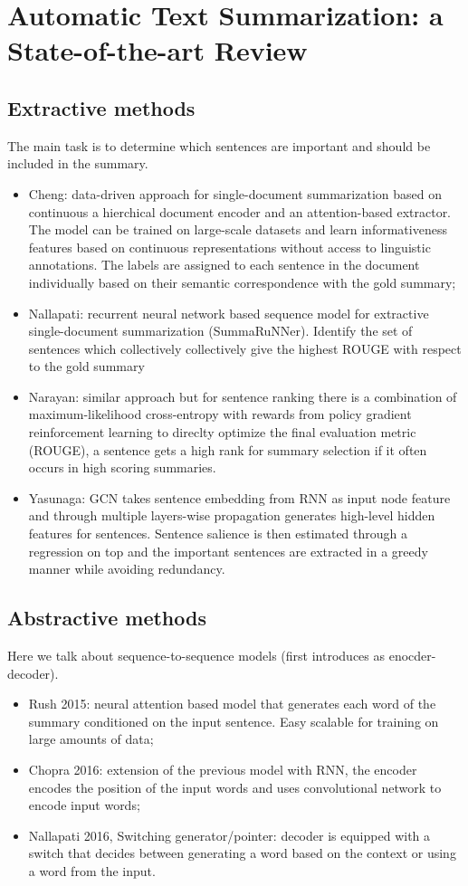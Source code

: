 \documentclass[12pt]{article}
\begin{document}
\section{Automatic Text Summarization: a State-of-the-art Review}
\subsection{Extractive methods}
The main task is to determine which sentences are important and should 
be included in the summary. 
\begin{itemize}
    \item Cheng: data-driven approach for single-document summarization based on continuous a 
    hierchical document encoder and an attention-based extractor. The model can be trained on large-scale
    datasets and learn informativeness features based on continuous representations without 
    access to linguistic annotations. The labels are assigned to each sentence in the 
    document individually based on their semantic correspondence with the gold summary;
    \item Nallapati: recurrent neural network based sequence model for extractive single-document
    summarization (SummaRuNNer). Identify the set of sentences which collectively collectively give the 
    highest ROUGE with respect to the gold summary
    \item Narayan: similar approach but for sentence ranking there is a combination of maximum-likelihood cross-entropy
    with rewards from policy gradient reinforcement learning to direclty optimize the final evaluation
    metric (ROUGE), a sentence gets a high rank for summary selection if it often occurs in high
    scoring summaries.
    \item Yasunaga: GCN takes sentence embedding from RNN as input node feature and through 
    multiple layers-wise propagation generates high-level hidden features for sentences. Sentence salience is then estimated
    through a regression on top and the important sentences are extracted in a greedy manner while avoiding redundancy.
\end{itemize}
\subsection{Abstractive methods}
Here we talk about sequence-to-sequence models (first introduces as enocder-decoder).
\begin{itemize}
    \item Rush 2015: neural attention based model that generates each word of the summary
    conditioned on the input sentence. Easy scalable for training on large amounts of data;
    \item Chopra 2016: extension of the previous model with RNN, the encoder encodes the position of the
    input words and uses convolutional network to encode input words;
    \item  Nallapati 2016, Switching generator/pointer: decoder is equipped with a switch that decides
    between generating a word based on the context or using a word from the input.
\end{itemize}
\end{document}
